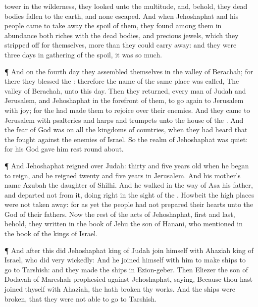 {tower in the
wilderness, they
looked unto the
multitude, and, behold, they
{} dead
bodies
fallen to the
earth, and none
escaped.
And when
Jehoshaphat and his
people
came to take
away the
spoil of them, they
found among them in
abundance both
riches with the dead
bodies, and
precious
jewels, which they stripped
off for themselves, more
than they could carry
away: and they were
three
days in
gathering of the
spoil, it was so
much.
\par }{\PP {}¶ And on the
fourth
day they
assembled themselves in the
valley of
Berachah; for there they
blessed the
{}: therefore the
name of the same
place was
called, The
valley of
Berachah, unto this
day.
Then they
returned, every
man of
Judah and
Jerusalem, and
Jehoshaphat in the
forefront of them, to go
again to
Jerusalem with
joy; for the
{} had made them to
rejoice over their
enemies.
And they
came to
Jerusalem with
psalteries and
harps and
trumpets unto the
house of the
{}.
And the
fear of
God was on all the
kingdoms of
{}
countries, when they had
heard that the
{}
fought against the
enemies of
Israel.
So the
realm of
Jehoshaphat was
quiet: for his
God gave him
rest round
about.
\par }{\PP {}¶ And
Jehoshaphat
reigned over
Judah:
{}
thirty and
five
years
old when he began to
reign, and he
reigned
twenty and
five
years in
Jerusalem. And his
mother’s
name
{}
Azubah the
daughter of
Shilhi.
And he
walked in the
way of
Asa his
father, and
departed not from it,
doing
{}
right in the
sight of the
{}.
Howbeit the high
places were not taken
away: for as yet the
people had not
prepared their
hearts unto the
God of their
fathers.
Now the
rest of the
acts of
Jehoshaphat,
first and
last, behold, they
{}
written in the
book of
Jehu the
son of
Hanani, who
{}
mentioned in the
book of the
kings of
Israel.
\par }{\PP {}¶ And
after this did
Jehoshaphat
king of
Judah
join himself with
Ahaziah
king of
Israel, who
did very
wickedly:
And he
joined himself with him to
make
ships to
go to
Tarshish: and they
made the
ships in
Ezion-geber.
Then
Eliezer the
son of
Dodavah of
Mareshah
prophesied against
Jehoshaphat,
saying, Because thou hast
joined thyself with
Ahaziah, the
{} hath
broken thy
works. And the
ships were
broken, that they were not
able to
go to
Tarshish.

}
